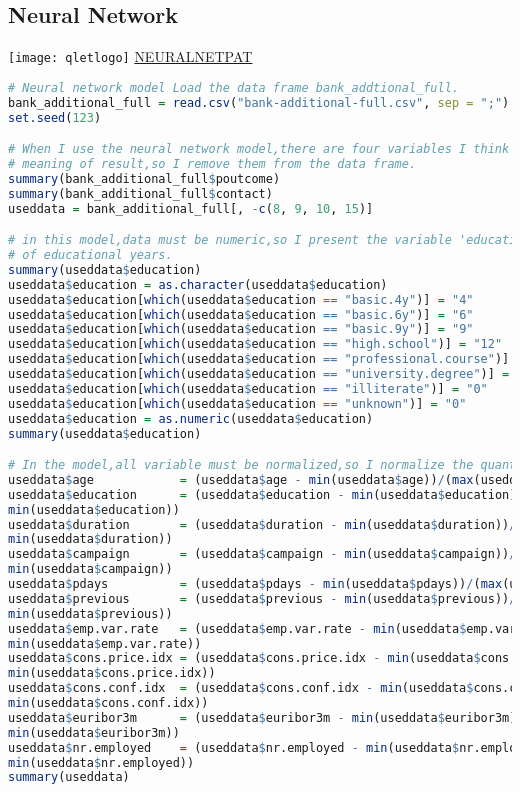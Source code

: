 \documentclass[12pt, a4paper, bibliography=totoc, english]{scrartcl}
\begin{document}
\subsection{Neural Network}
\texttt{[image: qletlogo]}
\textcolor{blue}{\href{https://github.com/JingyiLiu3136/MLFBM/blob/master/NEURALNETPAT/SPL_NEURALNETPAT.R}{NEURALNETPAT}}
\begin{lstlisting}[language = R]
# Neural network model Load the data frame bank_addtional_full.
bank_additional_full = read.csv("bank-additional-full.csv", sep = ";")
set.seed(123)

# When I use the neural network model,there are four variables I think don't have enough
# meaning of result,so I remove them from the data frame.
summary(bank_additional_full$poutcome)
summary(bank_additional_full$contact)
useddata = bank_additional_full[, -c(8, 9, 10, 15)]

# in this model,data must be numeric,so I present the variable 'education' as the length
# of educational years.
summary(useddata$education)
useddata$education = as.character(useddata$education)
useddata$education[which(useddata$education == "basic.4y")] = "4"
useddata$education[which(useddata$education == "basic.6y")] = "6"
useddata$education[which(useddata$education == "basic.9y")] = "9"
useddata$education[which(useddata$education == "high.school")] = "12"
useddata$education[which(useddata$education == "professional.course")] = "12"
useddata$education[which(useddata$education == "university.degree")] = "16"
useddata$education[which(useddata$education == "illiterate")] = "0"
useddata$education[which(useddata$education == "unknown")] = "0"
useddata$education = as.numeric(useddata$education)
summary(useddata$education)

# In the model,all variable must be normalized,so I normalize the quantitative variable
useddata$age            = (useddata$age - min(useddata$age))/(max(useddata$age) - min(useddata$age))
useddata$education      = (useddata$education - min(useddata$education))/(max(useddata$education) - 
min(useddata$education))
useddata$duration       = (useddata$duration - min(useddata$duration))/(max(useddata$duration) - 
min(useddata$duration))
useddata$campaign       = (useddata$campaign - min(useddata$campaign))/(max(useddata$campaign) - 
min(useddata$campaign))
useddata$pdays          = (useddata$pdays - min(useddata$pdays))/(max(useddata$pdays) - min(useddata$pdays))
useddata$previous       = (useddata$previous - min(useddata$previous))/(max(useddata$previous) - 
min(useddata$previous))
useddata$emp.var.rate   = (useddata$emp.var.rate - min(useddata$emp.var.rate))/(max(useddata$emp.var.rate) - 
min(useddata$emp.var.rate))
useddata$cons.price.idx = (useddata$cons.price.idx - min(useddata$cons.price.idx))/(max(useddata$cons.price.idx) - 
min(useddata$cons.price.idx))
useddata$cons.conf.idx  = (useddata$cons.conf.idx - min(useddata$cons.conf.idx))/(max(useddata$cons.conf.idx) - 
min(useddata$cons.conf.idx))
useddata$euribor3m      = (useddata$euribor3m - min(useddata$euribor3m))/(max(useddata$euribor3m) - 
min(useddata$euribor3m))
useddata$nr.employed    = (useddata$nr.employed - min(useddata$nr.employed))/(max(useddata$nr.employed) - 
min(useddata$nr.employed))
summary(useddata)


\end{lstlisting}
\end{document}
